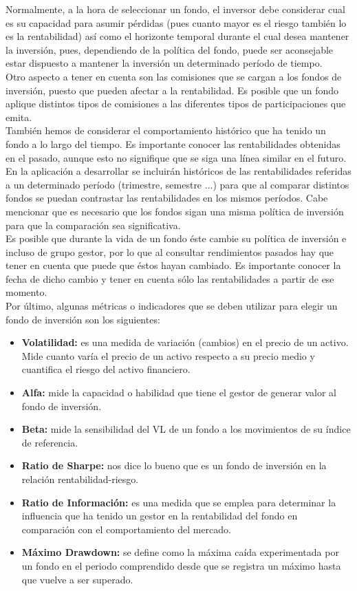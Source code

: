 \documentclass[12pt, a4paper]{article}
\begin{document}
Normalmente, a la hora de seleccionar un fondo, el inversor debe considerar cual es su capacidad para asumir pérdidas (pues cuanto mayor es el riesgo también lo es la rentabilidad) así como el horizonte temporal durante el cual desea mantener la inversión, pues, dependiendo de la política del fondo, puede ser aconsejable estar dispuesto a mantener la inversión un determinado período de tiempo.\\

Otro aspecto a tener en cuenta son las comisiones que se cargan a los fondos de inversión, puesto que pueden afectar a la rentabilidad. Es posible que un fondo aplique distintos tipos de comisiones a las diferentes tipos de participaciones que emita.\\

También hemos de considerar el comportamiento histórico que ha tenido un fondo a lo largo del tiempo. Es importante conocer las rentabilidades obtenidas en el pasado, aunque esto no signifique que se siga una línea similar en el futuro. En la aplicación a desarrollar se incluirán históricos de las rentabilidades referidas a un determinado período (trimestre, semestre ...) para que al comparar distintos fondos se puedan contrastar las rentabilidades en los mismos períodos. Cabe mencionar que es necesario que los fondos sigan una misma política de inversión para que la comparación sea significativa.\\

Es posible que durante la vida de un fondo éste cambie su política de inversión e incluso de grupo gestor, por lo que al consultar rendimientos pasados hay que tener en cuenta que puede que éstos hayan cambiado. Es importante conocer la fecha de dicho cambio y tener en cuenta sólo las rentabilidades a partir de ese momento.\\

Por último, algunas métricas o indicadores que se deben utilizar para elegir un fondo de inversión son los siguientes:

\begin{itemize}
	\item \textbf{Volatilidad:} es una medida de variación (cambios) en el precio de un activo. Mide cuanto varía el precio de un activo respecto a su precio medio y cuantifica el riesgo del activo financiero.
	\item \textbf{Alfa:} mide la capacidad o habilidad que tiene el gestor de generar valor al fondo de inversión.
	\item \textbf{Beta:} mide la sensibilidad del \gls{VL} de un fondo a los movimientos de su índice de referencia.
	\item \textbf{Ratio de Sharpe:} nos dice lo bueno que es un fondo de inversión en la relación rentabilidad-riesgo.
	\item \textbf{Ratio de Información:}  es una medida que se emplea para determinar la influencia que ha tenido un gestor en la rentabilidad del fondo en comparación con el comportamiento del mercado.
	\item \textbf{Máximo Drawdown:} se define como la máxima caída experimentada por un fondo en el periodo comprendido desde que se registra un máximo hasta que vuelve a ser superado.
\end{itemize}
\end{document}
